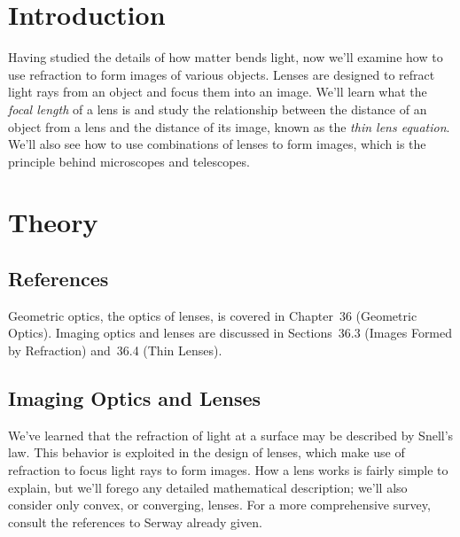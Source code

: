 \section{Introduction}

Having studied the details of how matter bends light, now we'll examine how 
to use refraction to form images of various objects.  Lenses are designed to 
refract light rays from an object and focus them into an image. We'll learn 
what the {\it focal length} of a lens is and study the relationship between 
the distance of an object from a lens and the distance of its image, known as 
the {\it thin lens equation}. We'll also see how to use combinations of lenses 
to form images, which is the principle behind microscopes and telescopes.

\section{Theory}

\subsection{References}

Geometric 
optics, the optics of lenses, is covered in Chapter~36 (Geometric Optics). 
Imaging optics and lenses are discussed in Sections~36.3 (Images 
Formed by Refraction) and~36.4 (Thin Lenses).  

\subsection{Imaging Optics and Lenses}

We've learned that the refraction of light at a surface may be described by 
Snell's law.  This behavior is exploited in the design of lenses, which make
use of refraction to focus light rays to form images.  How a lens works is 
fairly simple to explain, but we'll forego any detailed mathematical 
description; we'll also consider only convex, or converging, lenses.  For a 
more comprehensive survey, consult the references to Serway already given.

